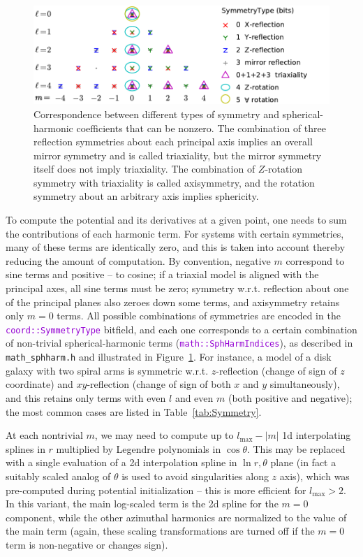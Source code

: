 \documentclass[12pt]{article}
\newcommand{\ttt}[1]{\textcolor{darkviolet}{\texttt{#1}}}
\begin{document}
\begin{figure}
\includegraphics{Symmetry.pdf}
\caption{Correspondence between different types of symmetry and spherical-harmonic coefficients that can be nonzero. The combination of three reflection symmetries about each principal axis implies an overall mirror symmetry and is called triaxiality, but the mirror symmetry itself does not imply triaxiality. The combination of $Z$-rotation symmetry with triaxiality is called axisymmetry, and the rotation symmetry about an arbitrary axis implies sphericity. }  \label{fig:Symmetry}
\end{figure}

To compute the potential and its derivatives at a given point, one needs to sum the contributions of each harmonic term. For systems with certain symmetries, many of these terms are identically zero, and this is taken into account thereby reducing the amount of computation. By convention, negative $m$ correspond to sine terms and positive -- to cosine; if a triaxial model is aligned with the principal axes, all sine terms must be zero; symmetry w.r.t. reflection about one of the principal planes also zeroes down some terms, and axisymmetry retains only $m=0$ terms. All possible combinations of symmetries are encoded in the \ttt{coord::SymmetryType} bitfield, and each one corresponds to a certain combination of non-trivial spherical-harmonic terms (\ttt{math::SphHarmIndices}), as described in \texttt{math_sphharm.h} and illustrated in Figure~\ref{fig:Symmetry}. For instance, a model of a disk galaxy with two spiral arms is symmetric w.r.t. $z$-reflection (change of sign of $z$ coordinate) and $xy$-reflection (change of sign of both $x$ and $y$ simultaneously), and this retains only terms with even $l$ and even $m$ (both positive and negative); the most common cases are listed in Table~\ref{tab:Symmetry}.

At each nontrivial $m$, we may need to compute up to $l_\mathrm{max}-|m|$ 1d interpolating splines in $r$ multiplied by Legendre polynomials in $\cos\theta$. This may be replaced with a single evaluation of a 2d interpolation spline in $\ln r,\theta$ plane (in fact a suitably scaled analog of $\theta$ is used to avoid singularities along $z$ axis), which was pre-computed during potential initialization -- this is more efficient for $l_\mathrm{max}>2$. In this variant, the main log-scaled term is the 2d spline for the $m=0$ component, while the other azimuthal harmonics are normalized to the value of the main term (again, these scaling transformations are turned off if the $m=0$ term is non-negative or changes sign).
\end{document}
